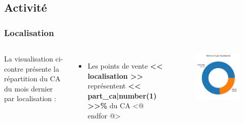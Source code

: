 \documentclass{beamer}
\begin{document}
    \subsection{Activité}

    \begin{frame}
        \tiny
        \frametitle{Localisation}

        \begin{columns}
                La visualisation ci-contre présente la répartition du CA du mois dernier par localisation :

                \begin{itemize}
                    <@ for localisation, part_ca in ca_par_localisation.items() @>
                        \item{Les points de vente \textbf{<< localisation >>} représentent \textbf{<< part_ca|number(1) >>\%} du CA}
                    <@ endfor @>
                \end{itemize}

                \centering

                \begin{figure}[h]
                    \centering
                    \includegraphics[width=1\textwidth]{assets/ca_par_localisation}
                \end{figure}
        \end{columns}


\end{frame}
\end{document}
